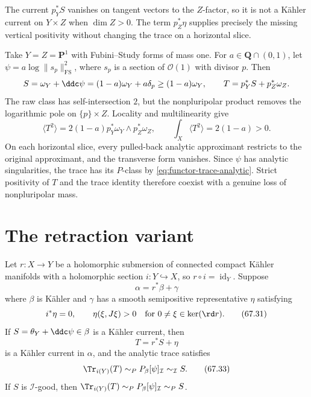 \begin{example}
\label{ex:functor-product-vertical-positivity}
The current $p_Y^*S$ vanishes on tangent vectors to the $Z$-factor,
so it is not a K\"ahler current on $Y\times Z$ when $\dim Z>0$.
The term $p_Z^*\eta$ supplies precisely the missing vertical
positivity without changing the trace on a horizontal slice.
\end{example}

\begin{example}
\label{ex:functor-product-mass}
Take $Y=Z=\mathbf P^1$ with Fubini--Study forms of mass one. For
$a\in\mathbf Q\cap(0,1)$, let $\psi=a\log\|s_p\|_{\mathrm{FS}}^2$, where $s_p$ is a
section of $\mathcal O(1)$ with divisor $p$. Then
\[
 S=\omega_Y+\ddc\psi=(1-a)\omega_Y+a\delta_p
       \geq(1-a)\omega_Y,
 \qquad T=p_Y^*S+p_Z^*\omega_Z.
\]
The raw class has self-intersection $2$, but the nonpluripolar product
removes the logarithmic pole on $\{p\}\times Z$. Locality and
multilinearity give
\[
 \langle T^2\rangle
   =2(1-a)p_Y^*\omega_Y\wedge p_Z^*\omega_Z,
 \qquad \int_X\langle T^2\rangle=2(1-a)>0.
\tag{67.29a}\label{eq:functor-product-npp-mass}
\]
On each horizontal slice, every pulled-back analytic approximant
restricts to the original approximant, and the transverse form vanishes.
Since $\psi$ has analytic singularities, the trace has its $P$-class by
\eqref{eq:functor-trace-analytic}. Strict positivity of $T$ and the trace
identity therefore coexist with a genuine loss of nonpluripolar mass.
\end{example}

\section{The retraction variant}
\label{sec:functor-retraction}

\begin{theorem}\label{thm:functor-retraction-trace}
Let $r:X\to Y$ be a holomorphic submersion of connected compact
K\"ahler manifolds with a holomorphic section
$i:Y\hookrightarrow X$, so $r\circ i=\operatorname{id}_Y$. Suppose
\[
                         \alpha=r^*\beta+\gamma
\tag{67.30}\label{eq:functor-retraction-class}
\]
where $\beta$ is K\"ahler and $\gamma$ has a smooth semipositive
representative $\eta$ satisfying
\[
 i^*\eta=0,
 \qquad
 \eta(\xi,J\xi)>0
       \quad\text{for }0\neq\xi\in\ker(\rd r).
\tag{67.31}\label{eq:functor-transverse-positive}
\]
If $S=\theta_Y+\ddc\psi\in\beta$ is a K\"ahler current, then
\[
                              T=r^*S+\eta
\tag{67.32}\label{eq:functor-retraction-current}
\]
is a K\"ahler current in $\alpha$, and
the analytic trace satisfies
\[
                       \Tr_{i(Y)}(T)
                 \sim_P P_\beta[\psi]_{\mathcal I}
                 \sim_{\mathcal I}S.
\tag{67.33}\label{eq:functor-retraction-trace}
\]
If $S$ is $\mathcal I$-good, then
$\Tr_{i(Y)}(T)\sim_P P_\beta[\psi]_{\mathcal I}\sim_P S$.
\end{theorem}

